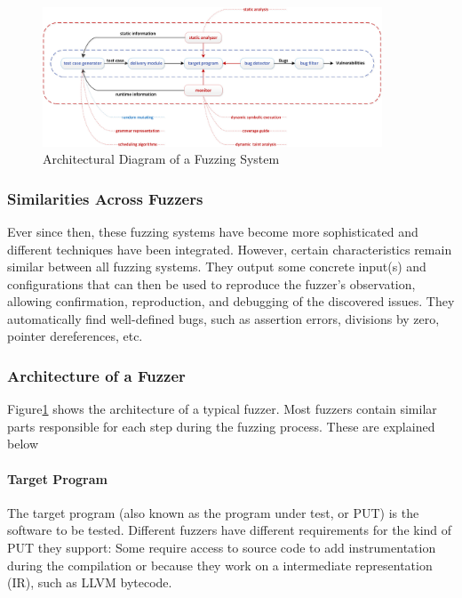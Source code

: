 \documentclass{article}
\begin{document}
\begin{multicols}{2}
    \begin{figure}[!tp]
        \centering
        \includegraphics[width=0.9\textwidth]{assets/FuzzingSteps.jpg}
        \caption{Architectural Diagram of a Fuzzing System\cite{Science}}
        \label{fig:FuzzingSteps}
    \end{figure}

    \subsubsection{Similarities Across Fuzzers}
    Ever since then, these fuzzing systems have become more sophisticated and different techniques have been integrated. However, certain characteristics remain similar between all fuzzing systems. They output some concrete input(s) and configurations that can then be used to reproduce the fuzzer's observation, allowing confirmation, reproduction, and debugging of the discovered issues.\cite{EvaluatingFuzzTesting} They automatically find well-defined bugs, such as assertion errors, divisions by zero,  pointer dereferences, etc.\cite{AllYouEverWanted}

    \subsubsection{Architecture of a Fuzzer}
    \label{ArchitectureFuzzer}
    Figure\ref{fig:FuzzingSteps} shows the architecture of a typical fuzzer. Most fuzzers contain similar parts responsible for each step during the fuzzing process. These are explained below

    \paragraph{Target Program}
    The target program (also known as the program under test, or PUT) is the software to be tested. Different fuzzers have different requirements for the kind of PUT they support: Some require access to source code to add instrumentation during the compilation or because they work on a intermediate representation (IR), such as LLVM bytecode.


\end{multicols}
\end{document}
